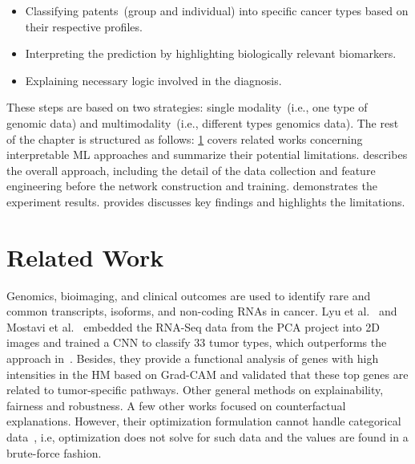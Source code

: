 \begin{itemize}[noitemsep]
\vspace{-2mm}
    \item Classifying patents~(group and individual) into specific cancer types based on their respective profiles.
    \item Interpreting the prediction by highlighting biologically relevant biomarkers.
    \item Explaining necessary logic involved in the diagnosis. 
    \vspace{-2mm}
\end{itemize}

\hspace*{3.5mm} These steps are based on two strategies: single modality~(i.e., one type of genomic data) and multimodality~(i.e., different types genomics data). 
The rest of the chapter is structured as follows: \cref{chapter_5:rw} covers related works concerning interpretable ML approaches and summarize their potential limitations.  describes the overall approach, including the detail of the data collection and feature engineering before the network construction and training.  demonstrates the experiment results.  provides discusses key findings and highlights the limitations. %

\section{Related Work}\label{chapter_5:rw}
Genomics, bioimaging, and clinical outcomes are used to identify rare and common transcripts, isoforms, and non-coding RNAs in cancer. 
Lyu et al.~\cite{lyu2018deep} and Mostavi et al.~\cite{mostavi2019convolutional} embedded the RNA-Seq data from the PCA project into 2D images and trained a CNN to classify 33 tumor types, which outperforms the approach in~\cite{li2017comprehensive}. Besides, they provide a functional analysis of genes with high intensities in the HM based on Grad-CAM and validated that these top genes are related to tumor-specific pathways. Other general methods on explainability, fairness and robustness. 
A few other works focused on counterfactual explanations. However, their optimization formulation cannot handle categorical data~\cite{ying2019gnnexplainer}, i.e, optimization does not solve for such data and the values are found in a brute-force fashion.

